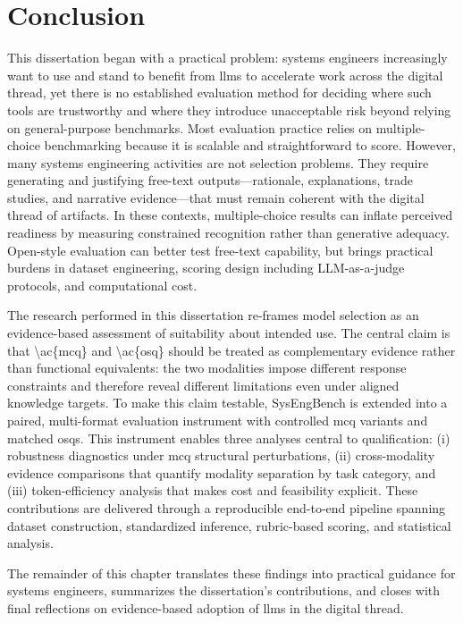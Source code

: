 \chapter{Conclusion}\label{ch:conclusion}

This dissertation began with a practical problem: systems engineers increasingly want to use and stand to benefit from \acp{llm} to accelerate work across the digital thread, yet there is no established evaluation method for deciding where such tools are trustworthy and where they introduce unacceptable risk beyond relying on general-purpose benchmarks. Most evaluation practice relies on multiple-choice benchmarking because it is scalable and straightforward to score. However, many systems engineering activities are not selection problems. They require generating and justifying free-text outputs---rationale, explanations, trade studies, and narrative evidence---that must remain coherent with the digital thread of artifacts. In these contexts, multiple-choice results can inflate perceived readiness by measuring constrained recognition rather than generative adequacy. Open-style evaluation can better test free-text capability, but brings practical burdens in dataset engineering, scoring design including LLM-as-a-judge protocols, and computational cost.

The research performed in this dissertation re-frames model selection as an evidence-based assessment of suitability about intended use. The central claim is that \textbackslash{}ac\{mcq\} and \textbackslash{}ac\{osq\} should be treated as complementary evidence rather than functional equivalents: the two modalities impose different response constraints and therefore reveal different limitations even under aligned knowledge targets. To make this claim testable, SysEngBench is extended into a paired, multi-format evaluation instrument with controlled \ac{mcq} variants and matched \acp{osq}. This instrument enables three analyses central to qualification: (i) robustness diagnostics under \ac{mcq} structural perturbations, (ii) cross-modality evidence comparisons that quantify modality separation by task category, and (iii) token-efficiency analysis that makes cost and feasibility explicit. These contributions are delivered through a reproducible end-to-end pipeline spanning dataset construction, standardized inference, rubric-based scoring, and statistical analysis.

The remainder of this chapter translates these findings into practical guidance for systems engineers, summarizes the dissertation’s contributions, and closes with final reflections on evidence-based adoption of \acp{llm} in the digital thread.


